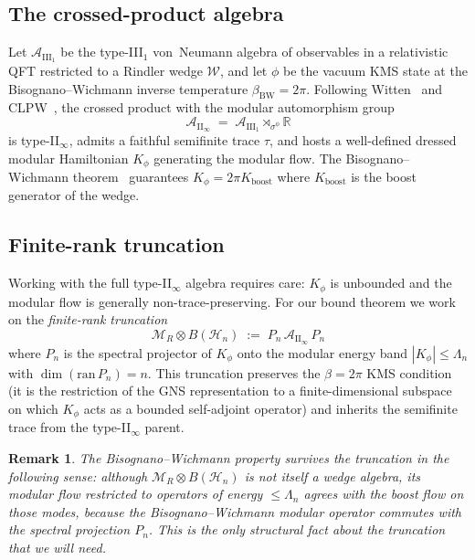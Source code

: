 \documentclass[12pt,a4paper]{article}
\newtheorem{remark}{Remark}
\begin{document}
\subsection{The crossed-product algebra}

Let $\mathcal{A}_{\mathrm{III}_1}$ be the type-III$_1$ von~Neumann
algebra of observables in a relativistic QFT restricted to a Rindler
wedge $\mathcal{W}$, and let $\phi$ be the vacuum KMS state at the
Bisognano--Wichmann inverse temperature $\beta_{\mathrm{BW}} = 2\pi$.
Following Witten~\cite{Witten2022} and CLPW~\cite{CLPW2023}, the
crossed product with the modular automorphism group
\begin{equation}
  \mathcal{A}_{\mathrm{II}_\infty}
  \;=\;
  \mathcal{A}_{\mathrm{III}_1} \rtimes_{\sigma^\phi} \mathbb{R}
  \label{eq:crossed}
\end{equation}
is type-II$_\infty$, admits a faithful semifinite trace $\tau$, and
hosts a well-defined dressed modular Hamiltonian $K_\phi$ generating
the modular flow.
The Bisognano--Wichmann theorem~\cite{BisognanoWichmann1976} guarantees
$K_\phi = 2\pi K_{\mathrm{boost}}$ where $K_{\mathrm{boost}}$ is the
boost generator of the wedge.

\subsection{Finite-rank truncation}

Working with the full type-II$_\infty$ algebra requires care: $K_\phi$
is unbounded and the modular flow is generally non-trace-preserving.
For our bound theorem we work on the \emph{finite-rank truncation}
\begin{equation}
  \mathcal{M}_R \otimes B(\mathcal{H}_n)
  \;:=\;
  P_n \,\mathcal{A}_{\mathrm{II}_\infty}\, P_n
  \label{eq:truncation}
\end{equation}
where $P_n$ is the spectral projector of $K_\phi$ onto the modular
energy band $|K_\phi| \le \Lambda_n$ with $\dim(\mathrm{ran}\,P_n) = n$.
This truncation preserves the $\beta = 2\pi$ KMS condition (it is the
restriction of the GNS representation to a finite-dimensional subspace
on which $K_\phi$ acts as a bounded self-adjoint operator) and inherits
the semifinite trace from the type-II$_\infty$ parent.

\begin{remark}\label{rem:bw-truncation}
The Bisognano--Wichmann property survives the truncation in the
following sense: although $\mathcal{M}_R \otimes B(\mathcal{H}_n)$ is
not itself a wedge algebra, its modular flow restricted to operators
of energy $\le \Lambda_n$ agrees with the boost flow on those modes,
because the Bisognano--Wichmann modular operator commutes with the
spectral projection $P_n$.
This is the only structural fact about the truncation that we will
need.
\end{remark}
\end{document}

